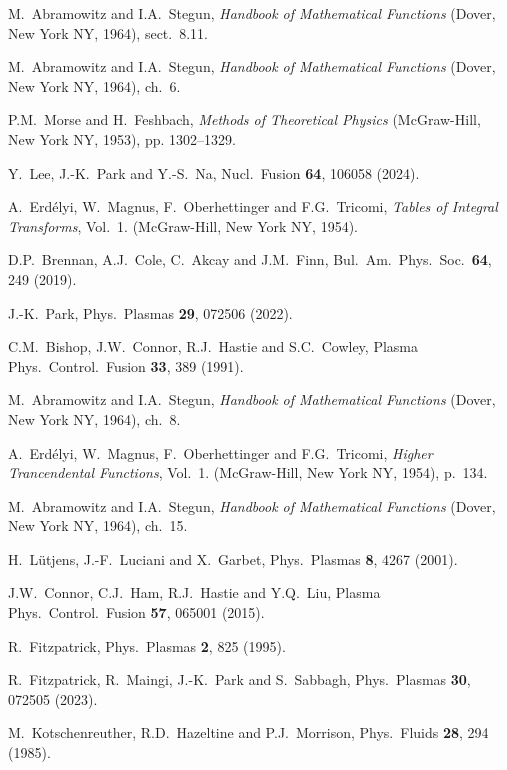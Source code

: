\documentclass[12pt,prb,aps]{revtex4-1}
\begin{document}
\begin{thebibliography}{99}
 M.~Abramowitz and I.A.~Stegun, {\em Handbook of Mathematical Functions}\/ (Dover, New York NY, 1964), sect.~8.11.

 M.~Abramowitz and I.A.~Stegun, {\em Handbook of Mathematical Functions}\/ (Dover, New York NY, 1964), ch.~6.

 P.M.~Morse and H.~Feshbach, {\em Methods of Theoretical Physics}\/ (McGraw-Hill, New York NY, 1953), pp. 1302–1329.

 Y.~Lee, J.-K.~Park and Y.-S.~Na, Nucl.\ Fusion {\bf 64}, 106058 (2024). 

 A.~Erd\'{e}lyi, W.~Magnus, F.~Oberhettinger and F.G.~Tricomi, {\em Tables of Integral Transforms}, Vol.~1. (McGraw-Hill, New York NY, 1954).

 D.P.~Brennan, A.J.~Cole, C.~Akcay and J.M.~Finn, Bul.\ Am.\ Phys.\ Soc.\ {\bf 64}, 249 (2019).

 J.-K.~Park, Phys.\ Plasmas {\bf 29}, 072506 (2022).

 C.M.~Bishop, J.W.~Connor, R.J.~Hastie and S.C.~Cowley, Plasma Phys.\ Control.\ Fusion {\bf 33}, 389 (1991). 

 M.~Abramowitz and I.A.~Stegun, {\em Handbook of Mathematical Functions}\/ (Dover, New York NY, 1964), ch.~8.

 A.~Erd\'{e}lyi, W.~Magnus, F.~Oberhettinger and F.G.~Tricomi, {\em Higher Trancendental Functions}, Vol.~1. (McGraw-Hill, New York NY, 1954), p.~134.

 M.~Abramowitz and I.A.~Stegun, {\em Handbook of Mathematical Functions}\/ (Dover, New York NY, 1964), ch.~15.

 H.~L\"{u}tjens, J.-F.~Luciani and X.~Garbet, Phys.\ Plasmas {\bf 8}, 4267 (2001).

 J.W.~Connor, C.J.~Ham, R.J.~Hastie and Y.Q.~Liu, Plasma Phys.\ Control.\ Fusion {\bf 57}, 065001 (2015). 

 R.~Fitzpatrick, Phys.\ Plasmas {\bf 2}, 825 (1995).

 R.~Fitzpatrick, R.~Maingi, J.-K.~Park and S.~Sabbagh, Phys.\ Plasmas {\bf 30}, 072505 (2023).

 M.~Kotschenreuther, R.D.~Hazeltine and P.J.~Morrison, Phys.\ Fluids {\bf 28}, 294 (1985). 

\end{thebibliography}
\end{document}
